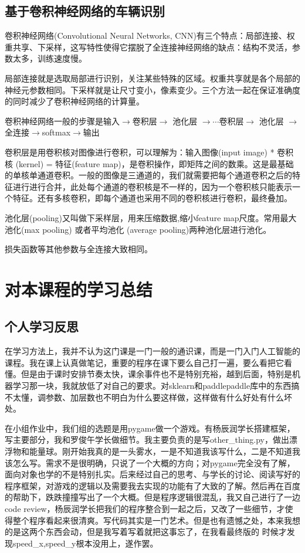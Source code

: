 \documentclass[UTF8]{ctexart}
\begin{document}
  \subsection{基于卷积神经网络的车辆识别}
  卷积神经网络(Convolutional Neural Networks, CNN)有三个特点：局部连接、权重共享、下采样，这写特性使得它摆脱了全连接神经网络的缺点：结构不灵活，参数太多，训练速度慢。\par 
  局部连接就是选取局部进行识别，关注某些特殊的区域。权重共享就是各个局部的神经元参数相同。下采样就是让尺寸变小，像素变少。三个方法一起在保证准确度的同时减少了卷积神经网络的计算量。\par 
  卷积神经网络一般的步骤是输入$\rightarrow$卷积层$\rightarrow$ 池化层 $ \rightarrow \cdots $卷积层$\rightarrow$ 池化层 $\rightarrow$ 全连接$\rightarrow$softmax$\rightarrow$输出\par
  卷积层是用卷积核对图像进行卷积，可以理解为：输入图像(input image) * 卷积核 (kernel) = 特征(feature map)，\*是卷积操作，即矩阵之间的数乘。这是最基础的单核单通道卷积。一般的图像是三通道的，我们就需要把每个通道卷积之后的特征进行进行合并，此处每个通道的卷积核是不一样的，因为一个卷积核只能表示一个特征。还有多核卷积，即每个通道也采用不同的卷积核进行卷积，最终叠加。\par
  池化层(pooling)又叫做下采样层，用来压缩数据,缩小feature map尺度。常用最大池化(max pooling) 或者平均池化 (average pooling)两种池化层进行池化。\par 
  损失函数等其他参数与全连接大致相同。
  \newpage
  \section[]{对本课程的学习总结}
  \subsection{个人学习反思}
  在学习方法上，我并不认为这门课是一门一般的通识课，而是一门入门人工智能的课程。我在课上认真做笔记，重要的程序在课下要么自己打一遍，要么看把它看懂。但是由于课时安排节奏太快，课余事件也不是特别充裕，越到后面，特别是机器学习那一块，我就放低了对自己的要求。对sklearn和paddlepaddle库中的东西搞不太懂，调参数、加层数也不明白为什么要这样做，这样做有什么好处有什么坏处。\par 
  在小组作业中，我们组的选题是用pygame做一个游戏。有杨辰润学长搭建框架，写主要部分，我和罗俊午学长做细节。我主要负责的是写other\_thing.py，做出漂浮物和能量球。刚开始我真的是一头雾水，一是不知道我该写什么，二是不知道我该怎么写。需求不是很明确，只说了一个大概的方向；对pygame完全没有了解，面向对象也学的不是特别扎实。后来经过自己的思考、与学长的讨论、阅读写好的程序框架，对游戏的逻辑以及需要我去实现的功能有了大致的了解。然后再在百度的帮助下，跌跌撞撞写出了一个大概。但是程序逻辑很混乱，我又自己进行了一边code review，杨辰润学长把我们的程序整合到一起之后，又改了一些细节，才使得整个程序看起来很清爽。写代码其实是一门艺术。但是也有遗憾之处，本来我想的是这两个东西会动，但是我写着写着就把这事忘了，在我看最终版的 时候才发现speed\_x,speed\_y根本没用上，遂作罢。
\end{document}
